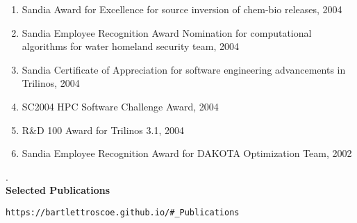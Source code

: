 \documentclass{report}
\newcommand{\sectitlevs}{1.2ex}
\newcommand{\secendvs}{1.5ex}
\newcommand{\indentone}{0.5in}
\newcommand{\widthone}{6.4in}
\newcommand{\pboxone}{\hspace*{\indentone}\parbox[t]{\widthone}}
\begin{document}
\begin{enumerate}
%
{}\item Sandia Award for Excellence for source inversion of chem-bio releases, 2004 
%
{}\item Sandia Employee Recognition Award Nomination for computational algorithms for water homeland security team, 2004
%
{}\item Sandia Certificate of Appreciation for software engineering advancements in Trilinos, 2004 
%
{}\item SC2004 HPC Software Challenge Award, 2004
%
{}\item R\&D 100 Award for Trilinos 3.1, 2004 
%
{}\item Sandia Employee Recognition Award for DAKOTA Optimization
Team, 2002
%
\end{enumerate}
%
{\tiny .}\\[\secendvs]
%
%
{}\textbf{\Large Selected Publications} \\[\sectitlevs]
%
\pboxone{\texttt{https://bartlettroscoe.github.io/\#\_Publications}}
%
\end{document}
